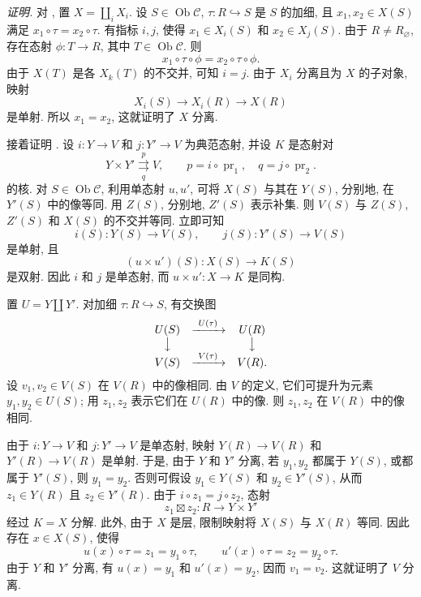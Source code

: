 \noindent\textit{证明.}
对 , 置 \(X=\coprod_i X_i\).
设 \(S\in\operatorname{Ob}\mathscr C\),
\(\tau:R\hookrightarrow S\) 是 \(S\) 的加细,
且 \(x_1,x_2\in X(S)\) 满足 \(x_1\circ\tau=x_2\circ\tau\).
有指标 \(i,j\), 使得 \(x_1\in X_i(S)\) 和 \(x_2\in X_j(S)\).
由于 \(R\ne R_{\varnothing}\), 存在态射 \(\phi:T\to R\),
其中 \(T\in\operatorname{Ob}\mathscr C\). 则
\[
  x_1\circ\tau\circ\phi=x_2\circ\tau\circ\phi.
\]
由于 \(X(T)\) 是各 \(X_k(T)\) 的不交并, 可知 \(i=j\).
由于 \(X_i\) 分离且为 \(X\) 的子对象, 映射
\[
  X_i(S)\longrightarrow X_i(R)\longrightarrow X(R)
\]
是单射. 所以 \(x_1=x_2\), 这就证明了 \(X\) 分离.

接着证明 .
设 \(i:Y\to V\) 和 \(j:Y'\to V\) 为典范态射,
并设 \(K\) 是态射对
\[
  Y\times Y'
  \overset{p}{\underset{q}{\rightrightarrows}}V,
  \qquad
  p=i\circ\operatorname{pr}_1,\quad
  q=j\circ\operatorname{pr}_2.
\]
的核. 对 \(S\in\operatorname{Ob}\mathscr C\),
利用单态射 \(u,u'\), 可将 \(X(S)\) 与其在 \(Y(S)\),
分别地, 在 \(Y'(S)\) 中的像等同.
用 \(Z(S)\), 分别地, \(Z'(S)\) 表示补集.
则 \(V(S)\) 与 \(Z(S)\), \(Z'(S)\) 和 \(X(S)\) 的不交并等同.
立即可知
\[
  i(S):Y(S)\longrightarrow V(S),
  \qquad
  j(S):Y'(S)\longrightarrow V(S)
\]
是单射, 且
\[
  (u\times u')(S):X(S)\longrightarrow K(S)
\]
是双射. 因此 \(i\) 和 \(j\) 是单态射,
而 \(u\times u':X\to K\) 是同构.

置 \(U=Y\coprod Y'\). 对加细
\(\tau:R\hookrightarrow S\), 有交换图
\[
\begin{array}{ccc}
  U(S)&\xrightarrow{\ U(\tau)\ }&U(R)\\
  \big\downarrow&&\big\downarrow\\
  V(S)&\xrightarrow{\ V(\tau)\ }&V(R).
\end{array}
\]
设 \(v_1,v_2\in V(S)\) 在 \(V(R)\) 中的像相同.
由 \(V\) 的定义, 它们可提升为元素 \(y_1,y_2\in U(S)\);
用 \(z_1,z_2\) 表示它们在 \(U(R)\) 中的像.
则 \(z_1,z_2\) 在 \(V(R)\) 中的像相同.

由于 \(i:Y\to V\) 和 \(j:Y'\to V\) 是单态射,
映射 \(Y(R)\to V(R)\) 和 \(Y'(R)\to V(R)\) 是单射.
于是, 由于 \(Y\) 和 \(Y'\) 分离,
若 \(y_1,y_2\) 都属于 \(Y(S)\), 或都属于 \(Y'(S)\),
则 \(y_1=y_2\). 否则可假设
\(y_1\in Y(S)\) 和 \(y_2\in Y'(S)\),
从而 \(z_1\in Y(R)\) 且 \(z_2\in Y'(R)\).
由于 \(i\circ z_1=j\circ z_2\), 态射
\[
  z_1\boxtimes z_2:R\longrightarrow Y\times Y'
\]
经过 \(K=X\) 分解. 此外, 由于 \(X\) 是层,
限制映射将 \(X(S)\) 与 \(X(R)\) 等同.
因此存在 \(x\in X(S)\), 使得
\[
  u(x)\circ\tau=z_1=y_1\circ\tau,
  \qquad
  u'(x)\circ\tau=z_2=y_2\circ\tau.
\]
由于 \(Y\) 和 \(Y'\) 分离, 有 \(u(x)=y_1\) 和 \(u'(x)=y_2\),
因而 \(v_1=v_2\). 这就证明了 \(V\) 分离.

